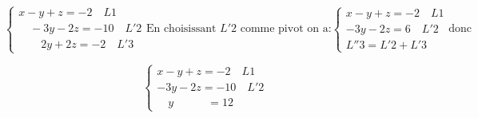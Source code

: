 \documentclass[12pt]{article}
\begin{document}
\begin{enumerate}
\begin{enumerate}
\[
\begin{cases}
x-y+z = -2\quad L1\\
\quad -3y-2z = -10\quad L'2\\
\quad\quad 2y+2z =-2\quad L'3
\end{cases}\text{En choisissant } L'2 \text{ comme pivot on a:}
\begin{cases}
x-y+z = -2\quad L1\\
-3y-2z = 6\quad L'2\\
L''3=L'2+L'3
\end{cases}\text{donc}
\]

\[
\begin{cases}
x-y+z = -2\quad L1\\
-3y-2z = -10\quad L'2\\
\quad y\quad\quad\quad=12
\end{cases}
\]
\end{enumerate}
\end{enumerate}
\end{document}
